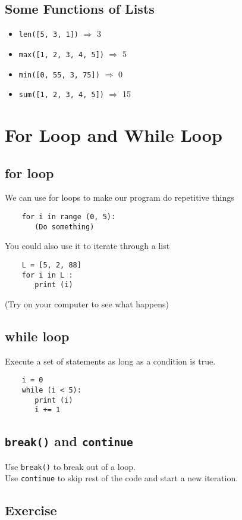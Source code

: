 \documentclass[12pt]{article}
\begin{document}
\begin{CJK*}{UTF8}{bkai}
\subsection{Some Functions of Lists}
\begin{itemize}
    \item \texttt{len([5, 3, 1])} $\Rightarrow$ 3
    \item \texttt{max([1, 2, 3, 4, 5])} $\Rightarrow$ 5
    \item \texttt{min([0, 55, 3, 75])} $\Rightarrow$ 0
    \item \texttt{sum([1, 2, 3, 4, 5])} $\Rightarrow$ 15
\end{itemize}

\section{For Loop and While Loop}
\subsection{for loop}
We can use for loops to make our program do repetitive things \\
\begin{verbatim}
    for i in range (0, 5):
       (Do something)
\end{verbatim}
You could also use it to iterate through a list
\begin{verbatim}
    L = [5, 2, 88]
    for i in L :
       print (i)
\end{verbatim}
(Try on your computer to see what happens)
\subsection{while loop}
Execute a set of statements as long as a condition is true.\\
\begin{verbatim}
    i = 0
    while (i < 5):
       print (i)
       i += 1
\end{verbatim}
\subsection{\texttt{break()} and \texttt{continue}}
Use \texttt{break()} to break out of a loop. \\

Use \texttt{continue} to skip rest of the code and start a new iteration. \\

\subsection{Exercise}


\end{CJK*}
\end{document}

